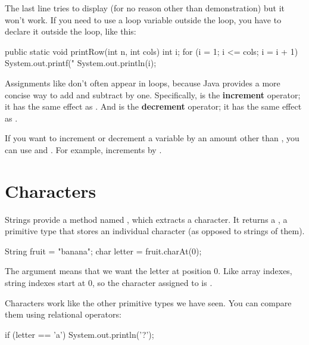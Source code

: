 The last line tries to display  (for no reason other than demonstration) but it won't work.
If you need to use a loop variable outside the loop, you have to declare it outside the loop, like this:

\begin{code}
public static void printRow(int n, int cols) {
    int i;
    for (i = 1; i <= cols; i = i + 1) {
        System.out.printf("%
    }
    System.out.println(i);
}
\end{code}


Assignments like  don't often appear in  loops, because Java provides a more concise way to add and subtract by one.
Specifically, \java{++} is the {\bf increment} operator; it has the same effect as .
And \java{--} is the {\bf decrement} operator; it has the same effect as .

If you want to increment or decrement a variable by an amount other than , you can use \java{+=} and \java{-=}.
For example,  increments  by .


\section{Characters}


Strings provide a method named , which extracts a character.
It returns a , a primitive type that stores an individual character (as opposed to strings of them).

\begin{code}
String fruit = "banana";
char letter = fruit.charAt(0);
\end{code}

The argument  means that we want the letter at position 0.
Like array indexes, string indexes start at 0, so the character assigned to  is .

Characters work like the other primitive types we have seen.
You can compare them using relational operators:

\begin{code}
if (letter == 'a') {
    System.out.println('?');
}
\end{code}


